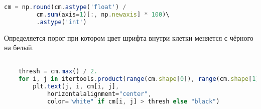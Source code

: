 \begin{lstlisting}[language=TypeScript, label=lst:normalize]
    cm = np.round(cm.astype('float') /
         cm.sum(axis=1)[:, np.newaxis] * 100)\
         .astype('int')

\end{lstlisting}

Определяется порог при котором цвет шрифта внутри клетки меняется с чёрного на белый.

\begin{lstlisting}[language=TypeScript, label=lst:normalize]

    thresh = cm.max() / 2.
    for i, j in itertools.product(range(cm.shape[0]), range(cm.shape[1])):
        plt.text(j, i, cm[i, j],
            horizontalalignment="center",
            color="white" if cm[i, j] > thresh else "black")

\end{lstlisting}

